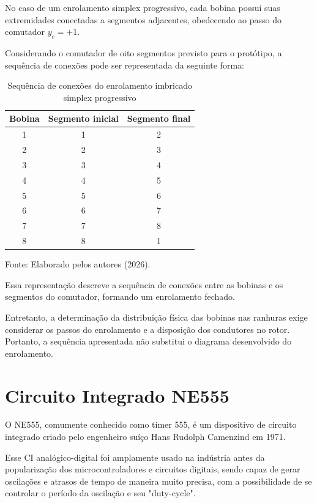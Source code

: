 \documentclass[12pt,openright,oneside,a4paper,brazilian]{abntex2}
\begin{document}
No caso de um enrolamento simplex progressivo, cada bobina possui suas extremidades conectadas a segmentos adjacentes, obedecendo ao passo do comutador $y_c=+1$.

Considerando o comutador de oito segmentos previsto para o protótipo, a sequência de conexões pode ser representada da seguinte forma:
\begin{table}[H]
    \centering
    \caption{Sequência de conexões do enrolamento
    imbricado simplex progressivo}
    \label{tab:enrolamento}

    \begin{tabular}{|c|c|c|}
        \hline
        \textbf{Bobina} &
        \textbf{Segmento inicial} &
        \textbf{Segmento final} \\
        \hline
        1 & 1 & 2 \\ \hline
        2 & 2 & 3 \\ \hline
        3 & 3 & 4 \\ \hline
        4 & 4 & 5 \\ \hline
        5 & 5 & 6 \\ \hline
        6 & 6 & 7 \\ \hline
        7 & 7 & 8 \\ \hline
        8 & 8 & 1 \\ \hline
    \end{tabular}

    \vspace{0.2cm}
    \par\small Fonte: Elaborado pelos autores (2026).
\end{table}
Essa representação descreve a sequência de conexões entre as bobinas e os segmentos do comutador, formando um enrolamento fechado.

Entretanto, a determinação da distribuição física das bobinas nas ranhuras exige considerar os passos do enrolamento e a disposição dos condutores no rotor. Portanto, a sequência apresentada não substitui o diagrama desenvolvido do enrolamento.

\section{Circuito Integrado NE555}

O NE555, comumente conhecido como timer 555, é um dispositivo de circuito integrado criado pelo engenheiro suíço Hans Rudolph Camenzind em 1971.

Esse CI analógico-digital foi amplamente usado na indústria antes da popularização dos microcontroladores e circuitos digitais, sendo capaz de gerar oscilações e atrasos de tempo de maneira muito precisa, com a possibilidade de se controlar o período da oscilação e seu "duty-cycle".
\end{document}
